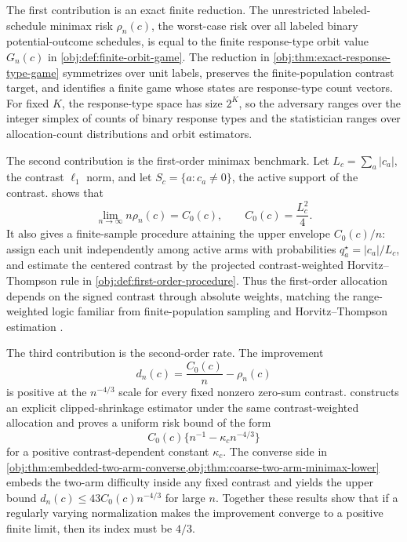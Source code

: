 \documentclass[11pt]{article}
\begin{document}
The first contribution is an exact finite reduction. The unrestricted labeled-schedule minimax risk \(\rho_n(c)\), the worst-case risk over all labeled binary potential-outcome schedules, is equal to the finite response-type orbit value \(G_n(c)\) in \cref{obj:def:finite-orbit-game}. The reduction in \cref{obj:thm:exact-response-type-game} symmetrizes over unit labels, preserves the finite-population contrast target, and identifies a finite game whose states are response-type count vectors. For fixed \(K\), the response-type space has size \(2^K\), so the adversary ranges over the integer simplex of counts of binary response types and the statistician ranges over allocation-count distributions and orbit estimators.

The second contribution is the first-order minimax benchmark. Let \(L_c=\sum_a |c_a|\), the contrast \(\ell_1\) norm, and let \(S_c=\{a:c_a\ne0\}\), the active support of the contrast.  shows that
\[
\lim_{n\to\infty} n\rho_n(c)=C_0(c),
\qquad
C_0(c)=\frac{L_c^2}{4}.
\]
It also gives a finite-sample procedure attaining the upper envelope \(C_0(c)/n\): assign each unit independently among active arms with probabilities \(q_a^\star=|c_a|/L_c\), and estimate the centered contrast by the projected contrast-weighted Horvitz--Thompson rule in \cref{obj:def:first-order-procedure}. Thus the first-order allocation depends on the signed contrast through absolute weights, matching the range-weighted logic familiar from finite-population sampling and Horvitz--Thompson estimation \citep{horvitz_1952,hansen_1953,sarndal_1992,aronow_lopatto_2026_minimax_unbiased}.

The third contribution is the second-order rate. The improvement
\[
d_n(c)=\frac{C_0(c)}{n}-\rho_n(c)
\]
is positive at the \(n^{-4/3}\) scale for every fixed nonzero zero-sum contrast.  constructs an explicit clipped-shrinkage estimator under the same contrast-weighted allocation and proves a uniform risk bound of the form
\[
C_0(c)\{n^{-1}-\kappa_c n^{-4/3}\}
\]
for a positive contrast-dependent constant \(\kappa_c\). The converse side in \cref{obj:thm:embedded-two-arm-converse,obj:thm:coarse-two-arm-minimax-lower} embeds the two-arm difficulty inside any fixed contrast and yields the upper bound \(d_n(c)\le 43C_0(c)n^{-4/3}\) for large \(n\). Together these results show that if a regularly varying normalization makes the improvement converge to a positive finite limit, then its index must be \(4/3\).
\end{document}
